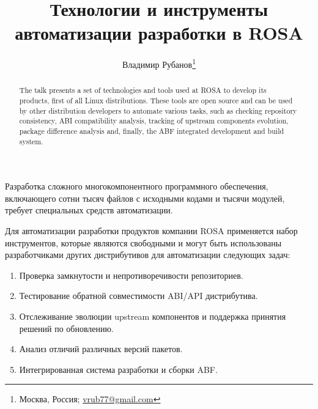 \documentclass[10pt, a5paper]{article}
\begin{document}
\title{Технологии и инструменты автоматизации разработки в ROSA}%

\author{Владимир Рубанов\footnote{Москва, Россия; \url{vrub77@gmail.com}}}
\maketitle

\begin{abstract}
The talk presents a set of technologies and tools used at ROSA to develop its products, first of all Linux distributions. These tools are open source and can be used by other distribution developers to automate various tasks, such as checking repository consistency, ABI compatibility analysis, tracking of upstream components evolution, package difference analysis and, finally, the ABF integrated development and build system.
\end{abstract}

Разработка сложного многокомпонентного программного обеспечения, включающего сотни тысяч файлов с исходными кодами и тысячи модулей, требует специальных средств автоматизации.

Для автоматизации разработки продуктов компании ROSA применяется набор инструментов, которые являются свободными и могут быть использованы разработчиками других дистрибутивов для автоматизации следующих задач:

\begin{enumerate}
  \item Проверка замкнутости и непротиворечивости репозиториев.
  \item Тестирование обратной совместимости ABI/API дистрибутива.
  \item Отслеживание эволюции upstream компонентов и поддержка принятия решений по обновлению.
  \item Анализ отличий различных версий пакетов.
  \item Интегрированная система разработки и сборки ABF.
\end{enumerate}
\end{document}
